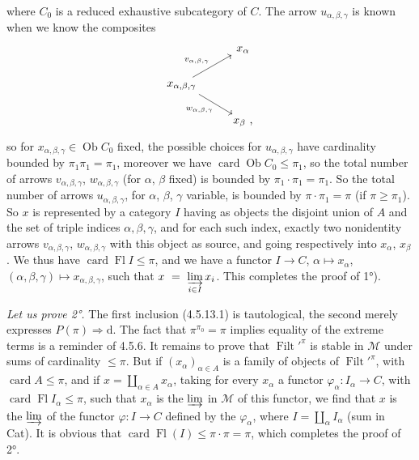 \documentclass[11pt]{article}
\newcommand{\printedpage}[1]{\marginpar{\footnotesize p.~#1}}
\newcommand{\msp}[1]{\marginpar{\footnotesize [#1]}}
\newcommand{\Filt}{\operatorname{Filt}}
\newcommand{\card}{\operatorname{card}}
\newcommand{\Fl}{\operatorname{Fl}}
\newcommand{\Ob}{\operatorname{Ob}}
\begin{document}
\printedpage{41}
where $C_0$ is a reduced exhaustive subcategory of $C$. The arrow $u_{\alpha,\beta,\gamma}$ is known when we know the composites
\msp{page 131}
\[
\begin{tikzcd}
& x_{\alpha} \\
x_{\alpha,\beta,\gamma} \arrow[ur, "v_{\alpha,\beta,\gamma}"] \arrow[dr, "w_{\alpha,\beta,\gamma}"'] & \\
& x_{\beta} \text{ ,}
\end{tikzcd}
\]
so for $x_{\alpha,\beta,\gamma} \in \Ob C_0$ fixed, the possible choices for $u_{\alpha,\beta,\gamma}$ have cardinality bounded by $\pi_1\pi_1 = \pi_1$, moreover we have $\card \Ob C_0 \leqslant \pi_1$, so the total number of arrows $v_{\alpha,\beta,\gamma}$, $w_{\alpha,\beta,\gamma}$ (for $\alpha$, $\beta$ fixed) is bounded by $\pi_1 \cdot \pi_1 = \pi_1$. So the total number of arrows $u_{\alpha,\beta,\gamma}$, for $\alpha$, $\beta$, $\gamma$ variable, is bounded by $\pi \cdot \pi_1 = \pi$ (if $\pi \geqslant \pi_1$). So $x$ is represented by a category $I$ having as objects the disjoint union of $A$ and the set of triple indices $\alpha,\beta,\gamma$, and for each such index, exactly two nonidentity arrows $v_{\alpha,\beta,\gamma}$, $w_{\alpha,\beta,\gamma}$ with this object as source, and going respectively into $x_{\alpha}$, $x_{\beta}$. We thus have $\card \Fl I \leqslant \pi$, and we have a functor $I \longrightarrow C$, $\alpha \longmapsto x_{\alpha}$, $(\alpha,\beta,\gamma) \longmapsto x_{\alpha,\beta,\gamma}$, such that $x \ = \ \varinjlim\limits_{i\in I} x_i$. This completes the proof of 1°).

\msp{page 132}
\textit{Let us prove 2°.} The first inclusion (4.5.13.1) is tautological, the second merely expresses $P(\pi) \Longrightarrow \mathrm{d}$. The fact that $\pi^{\pi_0} = \pi$ implies equality of the extreme terms is a reminder of 4.5.6. It remains to prove that $\Filt'^{\pi}$ is stable in $\mathcal{M}$ under sums of cardinality $\leqslant \pi$. But if $(x_{\alpha})_{\alpha\in A}$ is a family of objects of $\Filt'^{\pi}$, with $\card A \leqslant \pi$, and if $x = \coprod_{\alpha\in A} x_{\alpha}$, taking for every $x_{\alpha}$ a functor $\varphi_{\alpha} : I_{\alpha} \longrightarrow C$, with $\card \Fl I_{\alpha} \leqslant \pi$, such that $x_{\alpha}$ is the $\varinjlim$ in $\mathcal{M}$ of this functor, we find that $x$ is the $\varinjlim$ of the functor $\varphi : I \longrightarrow C$ defined by the $\varphi_{\alpha}$, where $I = \coprod_{\alpha} I_{\alpha}$ (sum in Cat). It is obvious that $\card \Fl(I) \leqslant \pi\cdot\pi = \pi$, which completes the proof of 2°.
\end{document}
